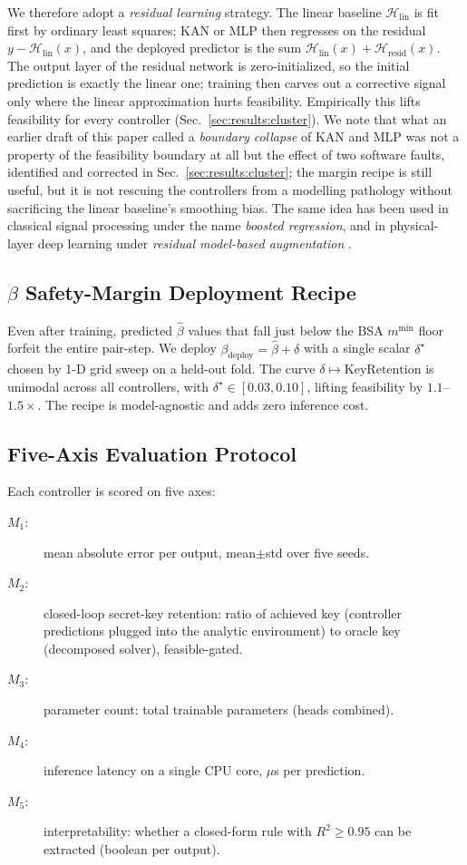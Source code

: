 We therefore adopt a \emph{residual learning} strategy. The linear baseline $\mathcal{H}_{\mathrm{lin}}$ is fit first by ordinary least squares; KAN or MLP then regresses on the residual $y - \mathcal{H}_{\mathrm{lin}}(x)$, and the deployed predictor is the sum $\mathcal{H}_{\mathrm{lin}}(x) + \mathcal{H}_{\mathrm{resid}}(x)$. The output layer of the residual network is zero-initialized, so the initial prediction is exactly the linear one; training then carves out a corrective signal only where the linear approximation hurts feasibility. Empirically this lifts feasibility for every controller (Sec.~\ref{sec:results:cluster}). We note that what an earlier draft of this paper called a \emph{boundary collapse} of KAN and MLP was not a property of the feasibility boundary at all but the effect of two software faults, identified and corrected in Sec.~\ref{sec:results:cluster}; the margin recipe is still useful, but it is not rescuing the controllers from a modelling pathology without sacrificing the linear baseline's smoothing bias. The same idea has been used in classical signal processing under the name \emph{boosted regression}, and in physical-layer deep learning under \emph{residual model-based augmentation} \cite{oshea2017introduction,wang2017deep}.

\subsection{$\beta$ Safety-Margin Deployment Recipe}\label{sec:controller:margin}

Even after training, predicted $\hat\beta$ values that fall just below the BSA $m^{\min}$ floor forfeit the entire pair-step. We deploy $\beta_{\mathrm{deploy}} = \hat\beta + \delta$ with a single scalar $\delta^\star$ chosen by 1-D grid sweep on a held-out fold. The curve $\delta\mapsto \mathrm{KeyRetention}$ is unimodal across all controllers, with $\delta^\star\in[0.03, 0.10]$, lifting feasibility by $1.1$--$1.5\times$. The recipe is model-agnostic and adds zero inference cost.

\subsection{Five-Axis Evaluation Protocol}

Each controller is scored on five axes:

\begin{description}
\item[$M_1$:] mean absolute error per output, mean$\pm$std over five seeds.
\item[$M_2$:] closed-loop secret-key retention: ratio of achieved key (controller predictions plugged into the analytic environment) to oracle key (decomposed solver), feasible-gated.
\item[$M_3$:] parameter count: total trainable parameters (heads combined).
\item[$M_4$:] inference latency on a single CPU core, $\mu$s per prediction.
\item[$M_5$:] interpretability: whether a closed-form rule with $R^2 \ge 0.95$ can be extracted (boolean per output).
\end{description}

